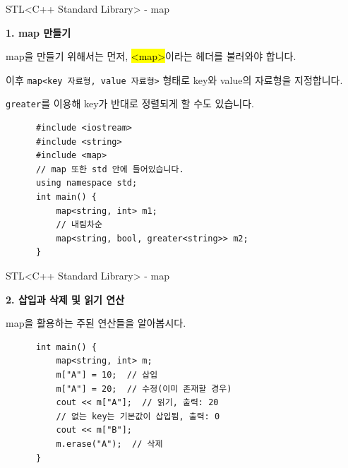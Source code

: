 \begin{frame}[fragile]{STL}{<C++ Standard Library> - map}
  \begin{twocol}
    \vspace{4mm}
    \textbf{1. map 만들기}\par\vspace{2mm}
    map을 만들기 위해서는 먼저, \hl{<map>}이라는 헤더를 불러와야 합니다.\par\vspace{2mm}
    이후 \texttt{map<key 자료형, value 자료형>} 형태로 key와 value의 자료형을 지정합니다.\par\vspace{2mm}
    \texttt{greater}를 이용해 key가 반대로 정렬되게 할 수도 있습니다.
  \colsplit
    \begin{verbatim}
      #include <iostream>
      #include <string>
      #include <map>
      // map 또한 std 안에 들어있습니다.
      using namespace std;
      int main() {
          map<string, int> m1;
          // 내림차순
          map<string, bool, greater<string>> m2;
      }
    \end{verbatim}
  \end{twocol}
\end{frame}

\begin{frame}[fragile]{STL}{<C++ Standard Library> - map}
  \begin{twocol}
    \vspace{8mm}
    \textbf{2. 삽입과 삭제 및 읽기 연산}\par\vspace{2mm}
    map을 활용하는 주된 연산들을 알아봅시다.
  \colsplit
    \begin{verbatim}
      int main() {
          map<string, int> m;
          m["A"] = 10;  // 삽입
          m["A"] = 20;  // 수정(이미 존재할 경우)
          cout << m["A"];  // 읽기, 출력: 20
          // 없는 key는 기본값이 삽입됨, 출력: 0
          cout << m["B"];
          m.erase("A");  // 삭제
      }
    \end{verbatim}
  \end{twocol}
\end{frame}

